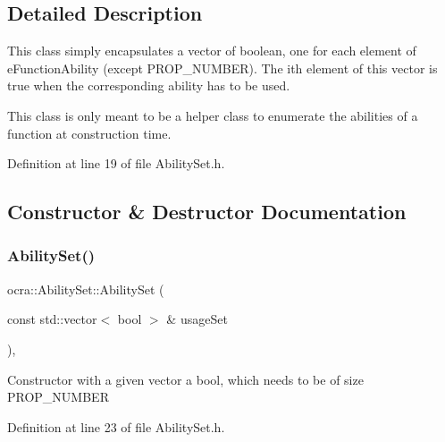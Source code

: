\subsection{Detailed Description}
This class simply encapsulates a vector of boolean, one for each element of e\+Function\+Ability (except P\+R\+O\+P\+\_\+\+N\+U\+M\+B\+ER). The ith element of this vector is true when the corresponding ability has to be used.

This class is only meant to be a helper class to enumerate the abilities of a function at construction time. 

Definition at line 19 of file Ability\+Set.\+h.



\subsection{Constructor \& Destructor Documentation}
\hypertarget{classocra_1_1AbilitySet_a0438cd73b840913711d2e7a768ff343a}{}\label{classocra_1_1AbilitySet_a0438cd73b840913711d2e7a768ff343a} 
\subsubsection{\texorpdfstring{Ability\+Set()}{AbilitySet()}\hspace{0.1cm}{\footnotesize\ttfamily [1/4]}}
{\footnotesize\ttfamily ocra\+::\+Ability\+Set\+::\+Ability\+Set (\begin{DoxyParamCaption}\item[{const std\+::vector$<$ bool $>$ \&}]{usage\+Set }\end{DoxyParamCaption})\hspace{0.3cm}{\ttfamily [inline]}, {\ttfamily [protected]}}

Constructor with a given vector a bool, which needs to be of size P\+R\+O\+P\+\_\+\+N\+U\+M\+B\+ER 

Definition at line 23 of file Ability\+Set.\+h.

\hypertarget{classocra_1_1AbilitySet_aec4a09919c73fc5e27aef8af05e7ebcf}{}\label{classocra_1_1AbilitySet_aec4a09919c73fc5e27aef8af05e7ebcf} 
